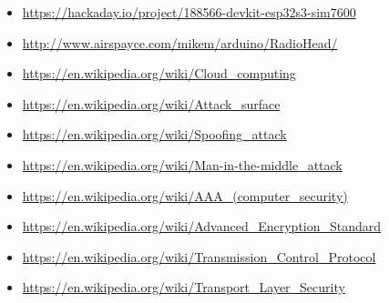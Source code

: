 \documentclass[11pt]{article}
\begin{document}
\begin{itemize}
    \item \url{https://hackaday.io/project/188566-devkit-esp32s3-sim7600}
    \item \url{http://www.airspayce.com/mikem/arduino/RadioHead/}
    \item \url{https://en.wikipedia.org/wiki/Cloud_computing}
    \item \url{https://en.wikipedia.org/wiki/Attack_surface}
    \item \url{https://en.wikipedia.org/wiki/Spoofing_attack}
    \item \url{https://en.wikipedia.org/wiki/Man-in-the-middle_attack}
    \item \url{https://en.wikipedia.org/wiki/AAA_(computer_security)}
    \item \url{https://en.wikipedia.org/wiki/Advanced_Encryption_Standard}
    \item \url{https://en.wikipedia.org/wiki/Transmission_Control_Protocol}
    \item \url{https://en.wikipedia.org/wiki/Transport_Layer_Security}
\end{itemize}
\end{document}
